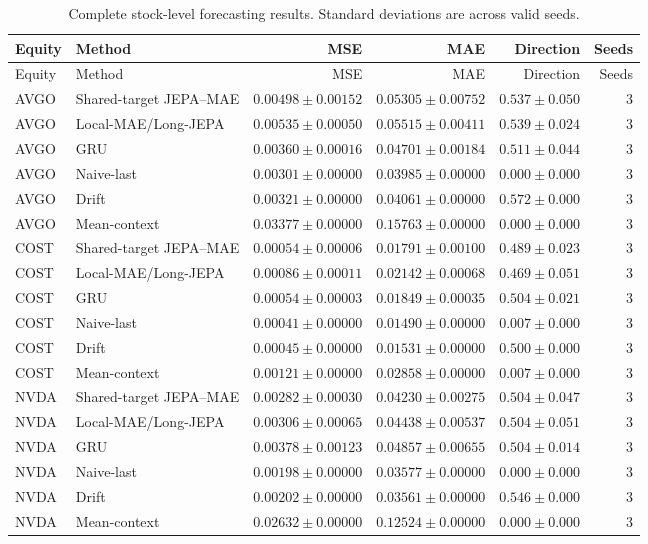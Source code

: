 \begin{longtable}{llrrrr}
\caption{Complete stock-level forecasting results. Standard deviations are across valid seeds.}\label{tab:appendix_stock_metrics}\\
\toprule
Equity & Method & MSE & MAE & Direction & Seeds \\
\midrule
\endfirsthead
\toprule
Equity & Method & MSE & MAE & Direction & Seeds \\
\midrule
\endhead
AVGO & Shared-target JEPA--MAE & $0.00498 \pm 0.00152$ & $0.05305 \pm 0.00752$ & $0.537 \pm 0.050$ & 3 \\
AVGO & Local-MAE/Long-JEPA & $0.00535 \pm 0.00050$ & $0.05515 \pm 0.00411$ & $0.539 \pm 0.024$ & 3 \\
AVGO & GRU & $0.00360 \pm 0.00016$ & $0.04701 \pm 0.00184$ & $0.511 \pm 0.044$ & 3 \\
AVGO & Naive-last & $0.00301 \pm 0.00000$ & $0.03985 \pm 0.00000$ & $0.000 \pm 0.000$ & 3 \\
AVGO & Drift & $0.00321 \pm 0.00000$ & $0.04061 \pm 0.00000$ & $0.572 \pm 0.000$ & 3 \\
AVGO & Mean-context & $0.03377 \pm 0.00000$ & $0.15763 \pm 0.00000$ & $0.000 \pm 0.000$ & 3 \\
COST & Shared-target JEPA--MAE & $0.00054 \pm 0.00006$ & $0.01791 \pm 0.00100$ & $0.489 \pm 0.023$ & 3 \\
COST & Local-MAE/Long-JEPA & $0.00086 \pm 0.00011$ & $0.02142 \pm 0.00068$ & $0.469 \pm 0.051$ & 3 \\
COST & GRU & $0.00054 \pm 0.00003$ & $0.01849 \pm 0.00035$ & $0.504 \pm 0.021$ & 3 \\
COST & Naive-last & $0.00041 \pm 0.00000$ & $0.01490 \pm 0.00000$ & $0.007 \pm 0.000$ & 3 \\
COST & Drift & $0.00045 \pm 0.00000$ & $0.01531 \pm 0.00000$ & $0.500 \pm 0.000$ & 3 \\
COST & Mean-context & $0.00121 \pm 0.00000$ & $0.02858 \pm 0.00000$ & $0.007 \pm 0.000$ & 3 \\
NVDA & Shared-target JEPA--MAE & $0.00282 \pm 0.00030$ & $0.04230 \pm 0.00275$ & $0.504 \pm 0.047$ & 3 \\
NVDA & Local-MAE/Long-JEPA & $0.00306 \pm 0.00065$ & $0.04438 \pm 0.00537$ & $0.504 \pm 0.051$ & 3 \\
NVDA & GRU & $0.00378 \pm 0.00123$ & $0.04857 \pm 0.00655$ & $0.504 \pm 0.014$ & 3 \\
NVDA & Naive-last & $0.00198 \pm 0.00000$ & $0.03577 \pm 0.00000$ & $0.000 \pm 0.000$ & 3 \\
NVDA & Drift & $0.00202 \pm 0.00000$ & $0.03561 \pm 0.00000$ & $0.546 \pm 0.000$ & 3 \\
NVDA & Mean-context & $0.02632 \pm 0.00000$ & $0.12524 \pm 0.00000$ & $0.000 \pm 0.000$ & 3 \\
\bottomrule
\end{longtable}
